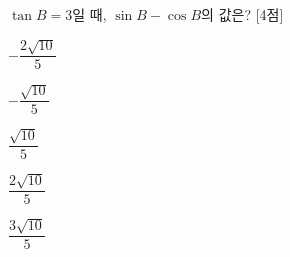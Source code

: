 $\tan B=3$일 때, $\sin B-\cos B$의 값은?  \mbox{[4점]}
\begin{choices32}{\rule[-3ex]{0pt}{8ex}$-\dfrac{2\sqrt{10}}{5}$}{\rule[-3ex]{0pt}{8ex}$-\dfrac{\sqrt{10}}{5}$}{\rule[-3ex]{0pt}{8ex}$\dfrac{\sqrt{10}}{5}$}{\rule[-3ex]{0pt}{8ex}$\dfrac{2\sqrt{10}}{5}$}{\rule[-3ex]{0pt}{8ex}$\dfrac{3\sqrt{10}}{5}$}\end{choices32}
